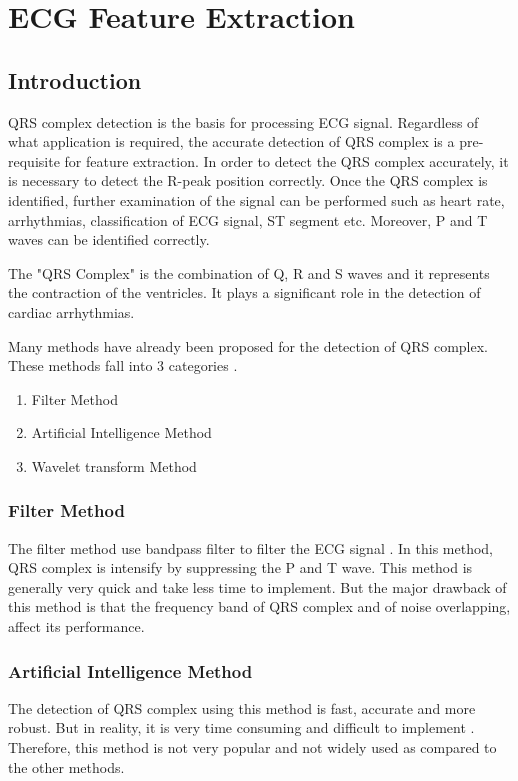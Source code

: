 \chapter{ECG Feature Extraction}


\section{Introduction}
QRS complex detection is the basis for processing ECG signal. Regardless of what application is required, the accurate detection of QRS complex is a pre-requisite for feature extraction. In order to detect the QRS complex accurately, it is necessary to detect the R-peak position correctly. Once the QRS complex is identified, further examination of the signal can be performed such as heart rate, arrhythmias, classification of ECG signal, ST segment etc. Moreover, P and T waves can be identified correctly.

The "QRS Complex" is the combination of Q, R and S waves and it represents the contraction of the ventricles. It plays a significant role in the detection of cardiac arrhythmias.

Many methods have already been proposed for the detection of QRS complex. These methods fall into 3 categories \cite{5639905}.

\begin{enumerate}
	\item Filter Method
	\item Artificial Intelligence Method
	\item Wavelet transform Method
\end{enumerate}

\subsection{Filter Method}
The filter method use bandpass filter to filter the ECG signal \cite{4122029}\cite{554762}. In this method, QRS complex is intensify by suppressing the P and T wave. This method is generally very quick and take less time to implement. But the major drawback of this method is that the frequency band of QRS complex and of noise overlapping, affect its performance.

\subsection{Artificial Intelligence Method}
The detection of QRS complex using this method is fast, accurate and more robust. But in reality, it is very time consuming and difficult to implement \cite{126604}\cite{PIETKA1991139}\cite{58593}. Therefore, this method is not very popular and not widely used as compared to the other methods.

